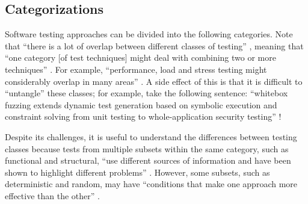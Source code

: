 \begin{landscape}
      \ieeeTestTermsTable{}
\end{landscape}

\begin{landscape}
      \otherTestTermsTable{}
\end{landscape}
\restoregeometry

\subsection{Categorizations}
\label{testing-categories}

Software testing approaches can be divided into the following
categories. Note that ``there is a lot of overlap between different classes of
testing'' \citep[p.~8]{Firesmith2015}, meaning that ``one category [of test
            techniques] might deal with combining two or more techniques''
\citep[p.~5-10]{SWEBOK2024}. For example, ``performance, load and stress
testing might considerably overlap in many areas'' \citep[p.~1187]{Moghadam2019}.
A side effect of this is that it is difficult to
``untangle'' these classes; for example, take the following sentence: ``whitebox
fuzzing extends dynamic test generation based on symbolic execution and
constraint solving from unit testing to whole-application security testing''
\citep[p.~23]{GodefroidAndLuchaup2011}!

Despite its challenges, it is useful to understand the differences between
testing classes because tests from multiple subsets within the same category,
such as functional and structural, ``use different sources of information and
have been shown to highlight different problems'' \citep[p.~5-16]{SWEBOK2024}.
However, some subsets, such as deterministic and random, may have ``conditions
that make one approach more effective than the other''
\citep[p.~5-16]{SWEBOK2024}.

